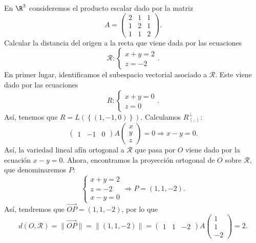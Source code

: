 \begin{eg}
\normalfont En $\displaystyle \R^{3} $ consideremos el producto escalar dado por la matriz 
\[ A = \begin{pmatrix} 2 & 1 & 1 \\
1 & 2 & 1\\
1 & 1 & 2\end{pmatrix} .\]
Calcular la distancia del origen a la recta que viene dada por las ecuaciones
\[ \mathcal{R} : 
\begin{cases}
x + y = 2 \\
z = - 2
\end{cases}
.\]
En primer lugar, identificamos el subespacio vectorial asociado a $\displaystyle \mathcal{R} $. Este viene dado por las ecuaciones
\[R :
\begin{cases}
x + y = 0 \\
z = 0
\end{cases}
.\]
Así, tenemos que $\displaystyle R = L\left( \left\{ \left(1, - 1, 0\right)\right\} \right) $. Calculamos $\displaystyle R^{\perp }_{\left\langle ,  \right\rangle } $:
\[\begin{pmatrix} 1 & - 1 & 0 \end{pmatrix} A \begin{pmatrix} x \\ y \\ z \end{pmatrix} = 0 \Rightarrow x - y = 0 .\]
Así, la variedad lineal afín ortogonal a $\displaystyle \mathcal{R} $ que pasa por $\displaystyle O $ viene dado por la ecuación $\displaystyle x-y = 0 $. Ahora, encontramos la proyección ortogonal de $\displaystyle O $ sobre $\displaystyle \mathcal{R} $, que denominaremos $\displaystyle P $:
\[
\begin{cases}
x + y = 2 \\
z = - 2 \\
x - y = 0
\end{cases}
\Rightarrow P = \left(1, 1, -2\right).\]
Así, tendremos que $\displaystyle \overrightarrow{OP} = \left(1,1,-2\right) $, por lo que
\[d\left(O, \mathcal{R}\right) = \|\overrightarrow{OP}\| = \|\left(1, 1, -2\right)\| = \begin{pmatrix} 1 & 1 & - 2 \end{pmatrix} A \begin{pmatrix} 1 \\ 1 \\ - 2 \end{pmatrix} = 2.\]
\end{eg}
